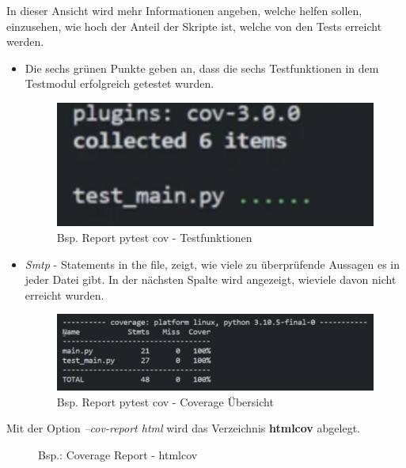 In dieser Ansicht wird mehr Informationen angeben, welche helfen sollen, einzusehen, wie hoch der Anteil der Skripte ist, welche von den Tests erreicht werden.
\begin{itemize}
	\item Die sechs grünen Punkte geben an, dass die sechs Testfunktionen in dem Testmodul erfolgreich getestet wurden.
	\begin{figure}[H]
	\centering
	\includegraphics[scale = 0.6]{attachment/chapter_2/Scc093}
	\caption{Bsp. Report pytest cov - Testfunktionen}
\end{figure}
	\item \textit{Smtp} - Statements in the file,  zeigt, wie viele zu überprüfende Aussagen es in jeder Datei gibt. In der nächsten Spalte wird angezeigt, wieviele davon nicht erreicht wurden.
	\begin{figure}[H]
	\centering
	\includegraphics[scale = 0.6]{attachment/chapter_2/Scc094}
	\caption{Bsp. Report pytest cov - Coverage Übersicht}
\end{figure}
\end{itemize}

Mit der Option \textit{--cov-report html} wird das Verzeichnis \textbf{htmlcov} abgelegt.

\begin{figure}[h]
	\centering
	\caption{Bsp.: Coverage Report - htmlcov}
\end{figure}

